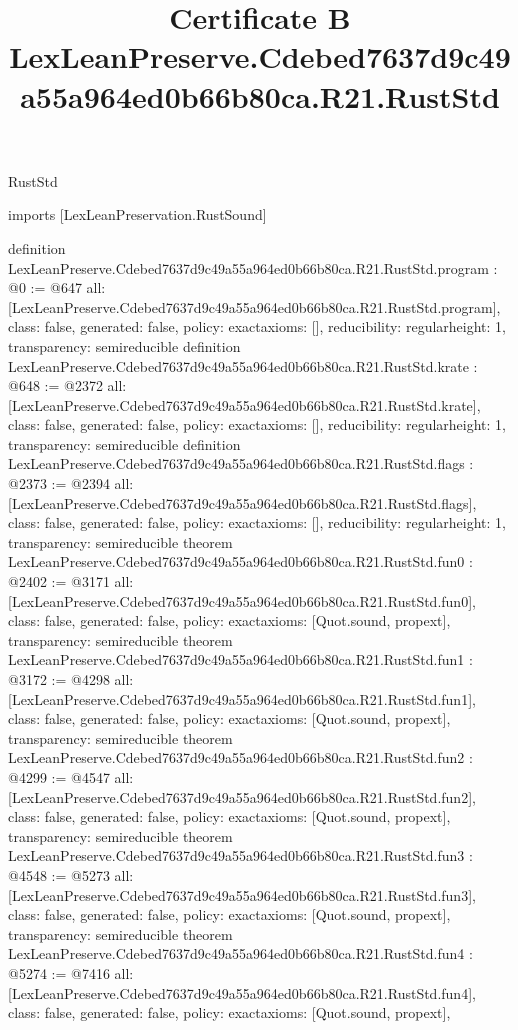 \begin{lexlean}{RustStd}
\title{Certificate B LexLeanPreserve.Cdebed7637d9c49a55a964ed0b66b80ca.R21.RustStd}
\begin{coremodule}
imports [LexLeanPreservation.RustSound]

definition LexLeanPreserve.Cdebed7637d9c49a55a964ed0b66b80ca.R21.RustStd.program : @0 := @647 {
  all: [LexLeanPreserve.Cdebed7637d9c49a55a964ed0b66b80ca.R21.RustStd.program],
  class: false,
  generated: false,
  policy: exact{axioms: []},
  reducibility: regular{height: 1},
  transparency: semireducible
}
definition LexLeanPreserve.Cdebed7637d9c49a55a964ed0b66b80ca.R21.RustStd.krate : @648 := @2372 {
  all: [LexLeanPreserve.Cdebed7637d9c49a55a964ed0b66b80ca.R21.RustStd.krate],
  class: false,
  generated: false,
  policy: exact{axioms: []},
  reducibility: regular{height: 1},
  transparency: semireducible
}
definition LexLeanPreserve.Cdebed7637d9c49a55a964ed0b66b80ca.R21.RustStd.flags : @2373 := @2394 {
  all: [LexLeanPreserve.Cdebed7637d9c49a55a964ed0b66b80ca.R21.RustStd.flags],
  class: false,
  generated: false,
  policy: exact{axioms: []},
  reducibility: regular{height: 1},
  transparency: semireducible
}
theorem LexLeanPreserve.Cdebed7637d9c49a55a964ed0b66b80ca.R21.RustStd.fun0 : @2402 := @3171 {
  all: [LexLeanPreserve.Cdebed7637d9c49a55a964ed0b66b80ca.R21.RustStd.fun0],
  class: false,
  generated: false,
  policy: exact{axioms: [Quot.sound, propext]},
  transparency: semireducible
}
theorem LexLeanPreserve.Cdebed7637d9c49a55a964ed0b66b80ca.R21.RustStd.fun1 : @3172 := @4298 {
  all: [LexLeanPreserve.Cdebed7637d9c49a55a964ed0b66b80ca.R21.RustStd.fun1],
  class: false,
  generated: false,
  policy: exact{axioms: [Quot.sound, propext]},
  transparency: semireducible
}
theorem LexLeanPreserve.Cdebed7637d9c49a55a964ed0b66b80ca.R21.RustStd.fun2 : @4299 := @4547 {
  all: [LexLeanPreserve.Cdebed7637d9c49a55a964ed0b66b80ca.R21.RustStd.fun2],
  class: false,
  generated: false,
  policy: exact{axioms: [Quot.sound, propext]},
  transparency: semireducible
}
theorem LexLeanPreserve.Cdebed7637d9c49a55a964ed0b66b80ca.R21.RustStd.fun3 : @4548 := @5273 {
  all: [LexLeanPreserve.Cdebed7637d9c49a55a964ed0b66b80ca.R21.RustStd.fun3],
  class: false,
  generated: false,
  policy: exact{axioms: [Quot.sound, propext]},
  transparency: semireducible
}
theorem LexLeanPreserve.Cdebed7637d9c49a55a964ed0b66b80ca.R21.RustStd.fun4 : @5274 := @7416 {
  all: [LexLeanPreserve.Cdebed7637d9c49a55a964ed0b66b80ca.R21.RustStd.fun4],
  class: false,
  generated: false,
  policy: exact{axioms: [Quot.sound, propext]},
}
\end{coremodule}
\end{lexlean}
